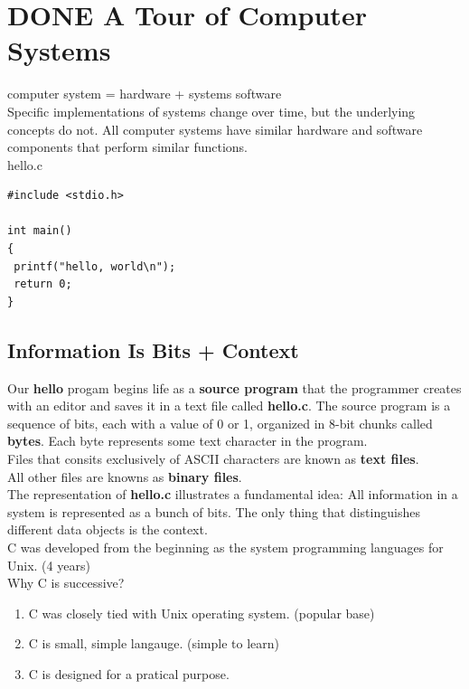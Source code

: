 \documentclass[11pt]{article}
\author{Mingming Li}
\date{\today}
\title{}
\begin{document}
\tableofcontents

\section{{\bfseries\sffamily DONE} A Tour of Computer Systems}
\label{sec:orge2dcf72}
computer system = hardware + systems software\\
Specific implementations of systems change over time, but the underlying concepts do not. All computer systems have similar hardware and software components that perform similar functions.\\


hello.c\\
\begin{verbatim}
#include <stdio.h>

int main()
{
 printf("hello, world\n");
 return 0;
}
\end{verbatim}

\subsection{Information Is Bits + Context}
\label{sec:orgeeaf3c4}
Our \textbf{hello} progam begins life as a \textbf{source program} that the programmer creates with an editor and saves it in a text file called \textbf{hello.c}. The source program is a sequence of bits, each with a value of 0 or 1, organized in 8-bit chunks called \textbf{bytes}. Each byte represents some text character in the program.\\


Files that consits exclusively of ASCII characters are known as \textbf{text files}.\\
All other files are knowns as \textbf{binary files}.\\

The representation of \textbf{hello.c} illustrates a fundamental idea: All information in a system is represented as a bunch of bits. The only thing that distinguishes different data objects is the context.\\

C was developed from the beginning as the system programming languages for Unix. (4 years)\\

Why C is successive?\\
\begin{enumerate}
\item C was closely tied with Unix operating system. (popular base)\\
\item C is small, simple langauge. (simple to learn)\\
\item C is designed for a pratical purpose.\\
\end{enumerate}
\end{document}
